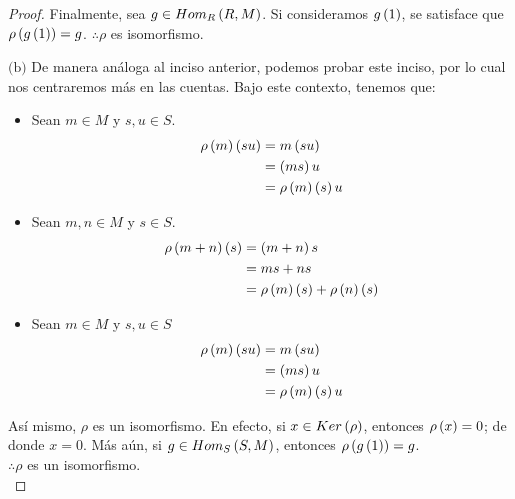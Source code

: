 \documentclass{article}
\begin{document}
\begin{enumerate}[label=\textbf{Ej \arabic*.}]
\begin{proof}
			Finalmente, sea $g \in Hom_{R}\left(R,M\right)$. Si consideramos $g\left(1\right)$, se satisface que $\rho \left(g\left(1\right)\right)=g$. $\therefore\rho$ es isomorfismo.
			
			$\boxed{\text{(b)}}$ De manera análoga al inciso anterior, podemos probar este inciso, por lo cual nos centraremos más en las cuentas. Bajo este contexto, tenemos que:
			\begin{itemize}
				\item Sean $m \in M$ y $s,u \in S$.
				\begin{align*}
					\rho\left(m\right)\left(su\right)&=m\left(su\right)\\
					&=\left(ms\right)u\\
					&=\rho\left(m\right)\left(s\right)u
				\end{align*}
				\item Sean $m,n \in M$ y $s \in S$.
				\begin{align*}
					\rho\left(m+n\right)\left(s\right)&=\left(m+n\right)s\\
					&=ms+ns\\
					&=\rho\left(m\right)\left(s\right)+\rho\left(n\right)\left(s\right)
				\end{align*}
				\item Sean $m \in M$ y $s,u \in S$
				\begin{align*}
					\rho\left(m\right)\left(su\right)&=m\left(su\right)\\
					&=\left(ms\right)u\\
					&=\rho\left(m\right)\left(s\right)u
				\end{align*}
			\end{itemize}
			
			Así mismo, $\rho$ es un isomorfismo. En efecto, si $x \in Ker\left( \rho \right)$, entonces $\rho \left(x\right)=0$; de donde $x=0$. Más aún, si $g \in Hom_{S}\left(S,M\right)$, entonces $\rho \left(g\left(1\right)\right)=g$.\\
			$\therefore\rho$ es un isomorfismo.\\
		\end{proof}
		

\end{enumerate}
\end{document}
